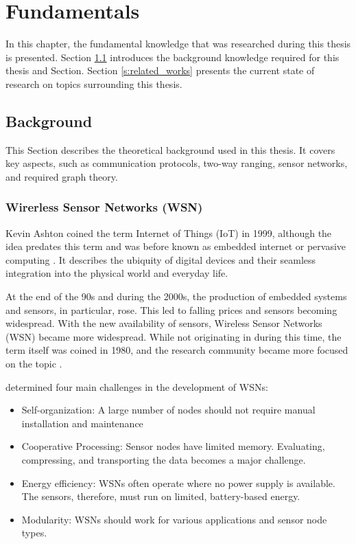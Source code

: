 \chapter{Fundamentals}

In this chapter, the fundamental knowledge that was researched during this thesis is presented.
Section \ref{s:background} introduces the background knowledge required for this thesis and Section.
Section \ref{s:related_works} presents the current state of research on topics surrounding this thesis.

\section{Background}
\label{s:background}

This Section describes the theoretical background used in this thesis.
It covers key aspects, such as communication protocols, two-way ranging, sensor networks, and required graph theory.


\subsection{Wirerless Sensor Networks (WSN)}
\label{S:WSN}
Kevin Ashton coined the term Internet of Things (IoT) in 1999, although the idea predates this term and was before known as embedded internet or pervasive computing \cite{alaba2024evolution}.
It describes the ubiquity of digital devices and their seamless integration into the physical world and everyday life.



At the end of the 90s and during the 2000s, the production of embedded systems and sensors, in particular, rose.
This led to falling prices and sensors becoming widespread.
With the new availability of sensors, Wireless Sensor Networks (WSN) became more widespread.
While not originating in during this time, the term itself was coined in 1980, and the research community became more focused on the topic \cite{jindal2018history}.

\cite{jindal2018history} determined four main challenges in the development of WSNs:
\begin{itemize}
\item Self-organization: A large number of nodes should not require manual installation and maintenance
\item Cooperative Processing: Sensor nodes have limited memory. Evaluating, compressing, and transporting the data becomes a major challenge.
\item Energy efficiency: WSNs often operate where no power supply is available. The sensors, therefore, must run on limited, battery-based energy.
\item Modularity: WSNs should work for various applications and sensor node types.
\end{itemize}

